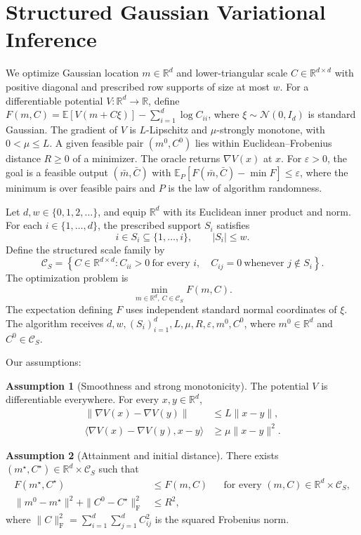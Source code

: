 \documentclass[10pt]{article}
\theoremstyle{definition}
\newtheorem{assumption}{Assumption}
\begin{document}
\section*{Structured Gaussian Variational Inference}
We optimize Gaussian location $m\in\mathbb{R}^d$ and lower-triangular scale $C\in\mathbb{R}^{d\times d}$ with positive diagonal and prescribed row supports of size at most $w$. For a differentiable potential $V:\mathbb{R}^d\to\mathbb{R}$, define $F(m,C)=\mathbb{E}[V(m+C\xi)]-\sum_{i=1}^d\log C_{ii}$, where $\xi\sim\mathcal{N}(0,I_d)$ is standard Gaussian. The gradient of $V$ is $L$-Lipschitz and $\mu$-strongly monotone, with $0<\mu\leq L$. A given feasible pair $(m^0,C^0)$ lies within Euclidean--Frobenius distance $R\geq0$ of a minimizer. The oracle returns $\nabla V(x)$ at $x$. For $\varepsilon>0$, the goal is a feasible output $(\bar m,\bar C)$ with $\mathbb{E}_{P}[F(\bar m,\bar C)-\min F]\leq\varepsilon$, where the minimum is over feasible pairs and $P$ is the law of algorithm randomness.

Let $d,w\in\{0,1,2,\ldots\}$, and equip $\mathbb{R}^d$ with its Euclidean inner product and norm. For each $i\in\{1,\ldots,d\}$, the prescribed support $S_i$ satisfies
\[
i\in S_i\subseteq\{1,\ldots,i\},
\qquad |S_i|\leq w.
\]
Define the structured scale family by
\[
\mathcal{C}_S=\left\{C\in\mathbb{R}^{d\times d}:
C_{ii}>0\ \text{for every }i,\quad
C_{ij}=0\ \text{whenever }j\notin S_i\right\}.
\]
The optimization problem is
\[
\min_{m\in\mathbb{R}^d,\ C\in\mathcal{C}_S} F(m,C).
\]
The expectation defining $F$ uses independent standard normal coordinates of $\xi$. The algorithm receives $d,w,(S_i)_{i=1}^d,L,\mu,R,\varepsilon,m^0,C^0$, where $m^0\in\mathbb{R}^d$ and $C^0\in\mathcal{C}_S$.

Our assumptions:
\begin{assumption}[Smoothness and strong monotonicity]
The potential $V$ is differentiable everywhere. For every $x,y\in\mathbb{R}^d$,
\[
\begin{aligned}
\|\nabla V(x)-\nabla V(y)\|&\leq L\|x-y\|,\\
\langle\nabla V(x)-\nabla V(y),x-y\rangle
&\geq\mu\|x-y\|^2.
\end{aligned}
\]
\end{assumption}

\begin{assumption}[Attainment and initial distance]
There exists $(m^\star,C^\star)\in\mathbb{R}^d\times\mathcal{C}_S$ such that
\[
\begin{aligned}
F(m^\star,C^\star)&\leq F(m,C)
&&\text{for every }(m,C)\in\mathbb{R}^d\times\mathcal{C}_S,\\
\|m^0-m^\star\|^2+\|C^0-C^\star\|_{\mathrm F}^2&\leq R^2,
\end{aligned}
\]
where $\|C\|_{\mathrm F}^2=\sum_{i=1}^d\sum_{j=1}^d C_{ij}^2$ is the squared Frobenius norm.
\end{assumption}
\end{document}
